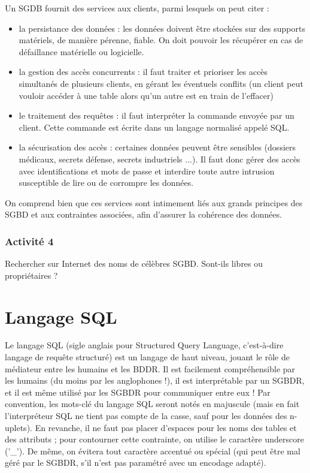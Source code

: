 \documentclass[11pt,a4paper,french,twoside]{PMCours}
\begin{document}
Un SGDB fournit des services aux clients, parmi lesquels on peut citer : 
\begin{itemize}
 \item la persistance des données : les données doivent être stockées sur des supports matériels, de manière pérenne, fiable. On doit pouvoir les récupérer en cas de défaillance matérielle ou logicielle.
 \item la gestion des accès concurrents : il faut traiter et prioriser les accès simultanés de plusieurs clients, en gérant les éventuels conflits (un client peut vouloir accéder à une table alors qu'un autre est en train de l'effacer)
 \item le traitement des requêtes : il faut interpréter la commande envoyée par un client. Cette commande est écrite dans un langage normalisé appelé SQL.
 \item la sécurisation des accès : certaines données peuvent être sensibles (dossiers médicaux, secrets défense, secrets industriels ...). Il faut donc gérer des accès avec identifications et mots de passe et interdire toute autre intrusion susceptible de lire ou de corrompre les données.
\end{itemize}
On comprend bien que ces services sont intimement liés aux grands principes des SGBD et aux contraintes associées, afin d'assurer la cohérence des données.


\subsubsection*{Activité 4}

Rechercher sur Internet des noms de célèbres SGBD. Sont-ils libres ou propriétaires ? 


\section{Langage SQL}

Le langage SQL (sigle anglais pour Structured Query Language, c'est-à-dire langage de requête structuré) est un langage de haut niveau, jouant le rôle de médiateur entre les humains et les BDDR. Il est facilement compréhensible par les humains (du moins par les anglophones !), il est interprétable par un SGBDR, et il est même utilisé par les SGBDR pour communiquer entre eux ! Par convention, les mots-clé du langage SQL seront notés en majuscule (mais en fait l'interpréteur SQL ne tient pas compte de la casse, sauf pour les données des n-uplets). En revanche, il ne faut pas placer d'espaces pour les noms des tables et des attributs ; pour contourner cette contrainte, on utilise le caractère underscore ('\_'). De même, on évitera tout caractère accentué ou spécial (qui peut être mal géré par le SGBDR, s'il n'est pas paramétré avec un encodage adapté).
\end{document}
